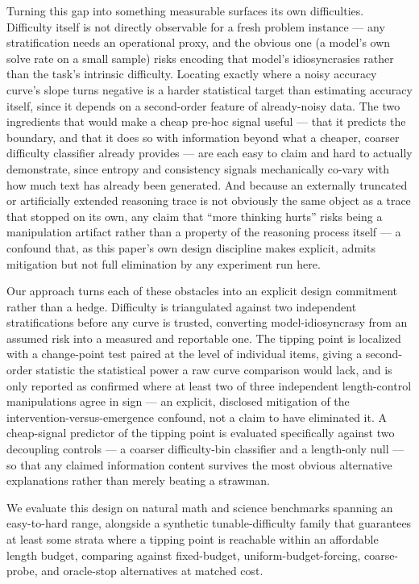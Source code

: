 \documentclass[11pt]{article}
\begin{document}
Turning this gap into something measurable surfaces its own difficulties. Difficulty itself is not directly observable for a fresh problem instance --- any stratification needs an operational proxy, and the obvious one (a model's own solve rate on a small sample) risks encoding that model's idiosyncrasies rather than the task's intrinsic difficulty. Locating exactly where a noisy accuracy curve's slope turns negative is a harder statistical target than estimating accuracy itself, since it depends on a second-order feature of already-noisy data. The two ingredients that would make a cheap pre-hoc signal useful --- that it predicts the boundary, and that it does so with information beyond what a cheaper, coarser difficulty classifier already provides --- are each easy to claim and hard to actually demonstrate, since entropy and consistency signals mechanically co-vary with how much text has already been generated. And because an externally truncated or artificially extended reasoning trace is not obviously the same object as a trace that stopped on its own, any claim that ``more thinking hurts'' risks being a manipulation artifact rather than a property of the reasoning process itself --- a confound that, as this paper's own design discipline makes explicit, admits mitigation but not full elimination by any experiment run here.

Our approach turns each of these obstacles into an explicit design commitment rather than a hedge. Difficulty is triangulated against two independent stratifications before any curve is trusted, converting model-idiosyncrasy from an assumed risk into a measured and reportable one. The tipping point is localized with a change-point test paired at the level of individual items, giving a second-order statistic the statistical power a raw curve comparison would lack, and is only reported as confirmed where at least two of three independent length-control manipulations agree in sign --- an explicit, disclosed mitigation of the intervention-versus-emergence confound, not a claim to have eliminated it. A cheap-signal predictor of the tipping point is evaluated specifically against two decoupling controls --- a coarser difficulty-bin classifier and a length-only null --- so that any claimed information content survives the most obvious alternative explanations rather than merely beating a strawman.

We evaluate this design on natural math and science benchmarks spanning an easy-to-hard range, alongside a synthetic tunable-difficulty family that guarantees at least some strata where a tipping point is reachable within an affordable length budget, comparing against fixed-budget, uniform-budget-forcing, coarse-probe, and oracle-stop alternatives at matched cost.
\end{document}
